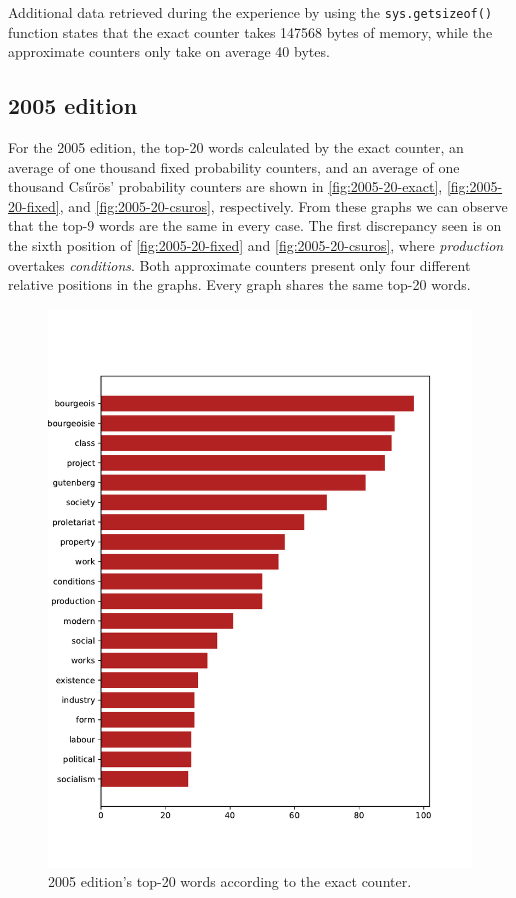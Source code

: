    
Additional data retrieved during the experience by using the \verb|sys.getsizeof()| function states that the exact counter takes 147568 bytes of memory, while the approximate counters only take on average 40 bytes.

\newpage
\subsection{2005 edition}

For the 2005 edition, the top-20 words calculated by the exact counter, an average of one thousand fixed probability counters, and an average of one thousand Csűrös' probability counters are shown in \autoref{fig:2005-20-exact}, \autoref{fig:2005-20-fixed}, and \autoref{fig:2005-20-csuros}, respectively.
From these graphs we can observe that the top-9 words are the same in every case. 
The first discrepancy seen is on the sixth position of \autoref{fig:2005-20-fixed} and \autoref{fig:2005-20-csuros}, where \emph{production} overtakes \emph{conditions}.
Both approximate counters present only four different relative positions in the graphs.
Every graph shares the same top-20 words.


\begin{figure}[!ht]
    \centering
    \includegraphics[width=0.9\linewidth]{figs/2005.epub-total}
    \caption{2005 edition's top-20 words according to the exact counter.}
    \label{fig:2005-20-exact}
\end{figure}


